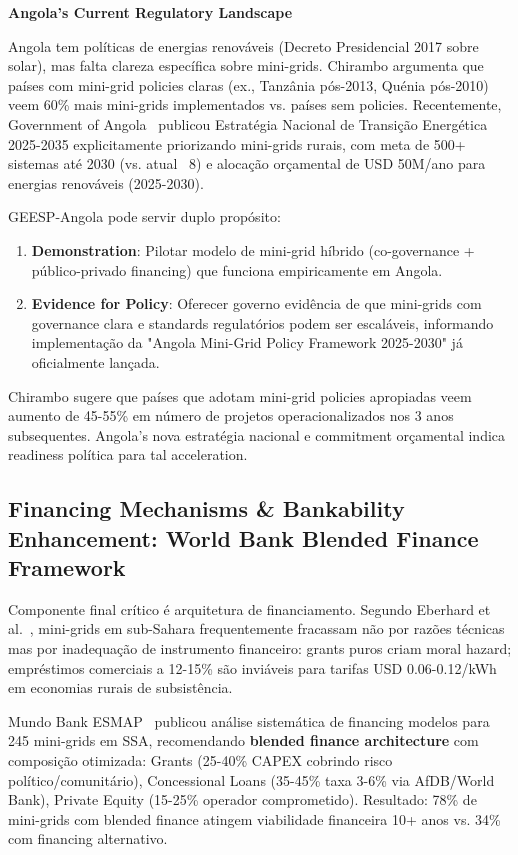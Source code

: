 \documentclass[12pt, a4paper]{article}
\begin{document}
\textbf{Angola's Current Regulatory Landscape}

Angola tem políticas de energias renováveis (Decreto Presidencial 2017 sobre solar), mas falta clareza específica sobre mini-grids. Chirambo argumenta que países com mini-grid policies claras (ex., Tanzânia pós-2013, Quénia pós-2010) veem 60\% mais mini-grids implementados vs. países sem policies. Recentemente, Government of Angola~\citep{GovernmentAngola2024} publicou Estratégia Nacional de Transição Energética 2025-2035 explicitamente priorizando mini-grids rurais, com meta de 500+ sistemas até 2030 (vs. atual ~8) e alocação orçamental de USD 50M/ano para energias renováveis (2025-2030).

GEESP-Angola pode servir duplo propósito:
\begin{enumerate}
\item \textbf{Demonstration}: Pilotar modelo de mini-grid híbrido (co-governance + público-privado financing) que funciona empiricamente em Angola.
\item \textbf{Evidence for Policy}: Oferecer governo evidência de que mini-grids com governance clara e standards regulatórios podem ser escaláveis, informando implementação da "Angola Mini-Grid Policy Framework 2025-2030" já oficialmente lançada.
\end{enumerate}

Chirambo sugere que países que adotam mini-grid policies apropiadas veem aumento de 45-55\% em número de projetos operacionalizados nos 3 anos subsequentes. Angola's nova estratégia nacional e commitment orçamental indica readiness política para tal acceleration.

\subsection{Financing Mechanisms \& Bankability Enhancement: World Bank Blended Finance Framework}

Componente final crítico é arquitetura de financiamento. Segundo Eberhard et al.~\citep{Eberhard2020}, mini-grids em sub-Sahara frequentemente fracassam não por razões técnicas mas por inadequação de instrumento financeiro: grants puros criam moral hazard; empréstimos comerciais a 12-15\% são inviáveis para tarifas USD 0.06-0.12/kWh em economias rurais de subsistência. 

Mundo Bank ESMAP~\citep{WorldBankESMAP2024} publicou análise sistemática de financing modelos para 245 mini-grids em SSA, recomendando \textbf{blended finance architecture} com composição otimizada: Grants (25-40\% CAPEX cobrindo risco político/comunitário), Concessional Loans (35-45\% taxa 3-6\% via AfDB/World Bank), Private Equity (15-25\% operador comprometido). Resultado: 78\% de mini-grids com blended finance atingem viabilidade financeira 10+ anos vs. 34\% com financing alternativo. 
\end{document}
